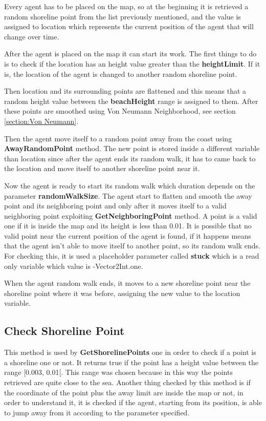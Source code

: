 \documentclass[12pt]{article}
\begin{document}
    Every agent has to be placed on the map, so at the beginning it is retrieved a random shoreline point from the list previously mentioned, and the value is assigned to location
    which represents the current position of the agent that will change over time.

    After the agent is placed on the map it can start its work. The first things to do is to check if the location has an height value greater than the \textbf{heightLimit}.
    If it is, the location of the agent is changed to another random shoreline point.
    
    Then location and its surrounding points are flattened and this means that a random height value between the \textbf{beachHeight} range is assigned
    to them. After these points are smoothed using Von Neumann Neighborhood, see section \ref{section:Von Neumann}.

    Then the agent move itself to a random point away from the coast using \textbf{AwayRandomPoint} method. The new point is stored inside a different variable
    than location since after the agent ends its random walk, it has to came back to the location and move itself to another shoreline point near it.

    Now the agent is ready to start its random walk which duration depends on the parameter \textbf{randomWalkSize}. The agent start to flatten and smooth the away point
    and its neighboring point and only after it moves itself to a valid neighboring point exploiting \textbf{GetNeighboringPoint} method. A point is a valid one if it is 
    inside the map and its height is less than 0.01. It is possible that no valid point near the current position of the agent is found, if it happens means that the 
    agent isn't able to move itself to another point, so its random walk ends. For checking this, it is used a placeholder parameter  called \textbf{stuck} which is 
    a read only variable which value is -Vector2Int.one.

    When the agent random walk ends, it moves to a new shoreline point near the shoreline point where it was before, assigning the new value to the 
    location variable.

    \subsection{Check Shoreline Point}
    This method is used by \textbf{GetShorelinePoints} one in order to check if a point is a shoreline one or not. It returns true if the point has a height value
    between the range [0.003, 0.01[. This range was chosen because in this way the points retrieved are quite close to the sea. Another thing checked by this method is
    if the coordinate of the point plus the away limit are inside the map or not, in order to understand it, it is checked if the agent, starting from its position, is able to jump away from it
    according to the parameter specified.
\end{document}
